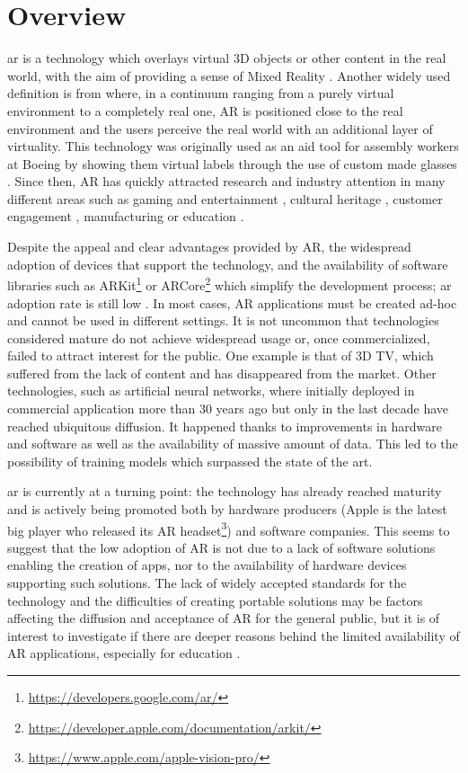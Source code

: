 \section{Overview}\label{sec:overview}

\gls{ar} is a technology which overlays virtual 3D objects or other content in the real world, with the aim of providing a sense of Mixed Reality \citep{azuma1997survey}. Another widely used definition is from \cite{milgram1994taxonomy} where, in a continuum ranging from a purely virtual environment to a completely real one, AR is positioned close to the real environment and the users perceive the real world with an additional layer of virtuality. This technology was originally used as an aid tool for assembly workers at Boeing by showing them virtual labels through the use of custom made glasses \citep{caudell1992augmented}. Since then, AR has quickly attracted research and industry attention in many different areas such as gaming and entertainment \citep{das2017augmented}, cultural heritage \citep{vlachos2022review}, customer engagement \citep{mclean2019shopping}, manufacturing \citep{ong2008augmented} or education \citep{garzon2019systematic}. 

Despite the appeal and clear advantages provided by AR, the widespread adoption of devices that support the technology, and the availability of software libraries such as ARKit\footnote{\url{https://developers.google.com/ar/}} or ARCore\footnote{\url{https://developer.apple.com/documentation/arkit/}} which simplify the development process; \gls{ar} adoption rate is still low \citep{jalo2022extended}. In most cases, AR applications must be created ad-hoc and cannot be used in different settings. It is not uncommon that technologies considered mature do not achieve widespread usage or, once commercialized, failed to attract interest for the public. One example is that of 3D TV, which suffered from the lack of content and has disappeared from the market. Other technologies, such as artificial neural networks, where initially deployed in commercial application more than 30 years ago \citep{lecun1989handwritten} but only in the last decade have reached ubiquitous diffusion. It happened thanks to improvements in hardware and software as well as the availability of massive amount of data. This led to the possibility of training models which surpassed the state of the art.

\gls{ar} is currently at a turning point: the technology has already reached maturity and is actively being promoted both by hardware producers (Apple is the latest big player who released its AR headset\footnote{\url{https://www.apple.com/apple-vision-pro/}}) and software companies. This seems to suggest that the low adoption of AR is not due to a lack of software solutions enabling the creation of apps, nor to the availability of hardware devices supporting such solutions. The lack of widely accepted standards for the technology and the difficulties of creating portable solutions may be factors affecting the diffusion and acceptance of AR for the general public, but it is of interest to investigate if there are deeper reasons behind the limited availability of AR applications, especially for education \citep{doi/10.2759/121671}.

